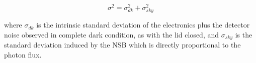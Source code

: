 \begin{equation}
\sigma^2=\sigma^2_{dk}+\sigma^2_{sky}
\end{equation}

\noindent
where $\sigma_{dk}$ is the intrinsic standard deviation of the electronics plus the detector noise observed in complete dark condition, as with the lid closed, and $\sigma_{sky}$ is the standard deviation induced by the  NSB  which is directly proportional to the photon flux.

